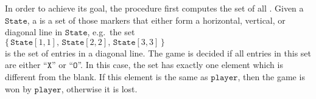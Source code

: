 \begin{enumerate}
      In order to achieve its goal, the procedure first computes the set of all .
      Given a $\texttt{State}$, a  is a set of those markers that either form a horizontal,
      vertical, or diagonal line in $\texttt{State}$, e.g.~the set 
      \\[0.2cm]
      \hspace*{1.3cm}
      $\{\, \texttt{State}[1,1],\, \texttt{State}[2,2],\, \texttt{State}[3,3]\, \}$
      \\[0.2cm]
      is the set of entries in a diagonal line.  The game is decided if all entries in this set are either
      ``$\texttt{X}$'' or ``$\texttt{O}$''.  In this case, the set has exactly one element which is different
      from the blank.  If this element is the same as $\texttt{player}$, then the game is won by
      $\texttt{player}$, otherwise it is lost.


\end{enumerate}
